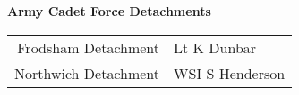 \vspace*{10mm}

\begin{center}
  \Large
  \textbf{Army Cadet Force Detachments}
\end{center}

\begin{center}
  \begin{tabular}{rl}
    Frodsham Detachment & Lt K Dunbar \\
    Northwich Detachment & WSI S Henderson \\
  \end{tabular}
\end{center}
